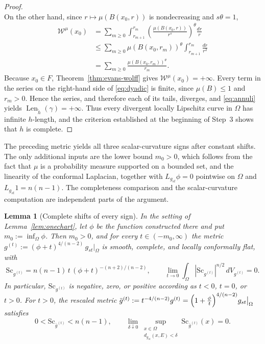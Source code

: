 \documentclass[12pt,oneside,a4paper]{article}
\theoremstyle{mytheorem}
\newtheorem{lemma}[definition]{Lemma}
\theoremstyle{remark}
\theoremstyle{definition}
\begin{document}
\begin{proof}
\begin{equation}
\end{equation}
On the other hand, since $r\mapsto\mu(B(x_0,r))$ is nondecreasing and
$s\theta=1$,
\begin{equation}\label{eq:dyadic}
\begin{aligned}
 \mathcal{W}^{\mu}(x_0)
 &=
 \sum_{m\ge0}
 \int_{r_{m+1}}^{r_m}
 \left(
 \frac{\mu(B(x_0,r))}{r^s}
 \right)^\theta
 \frac{dr}{r}
 \\
 &\le
 \sum_{m\ge0}
 \mu(B(x_0,r_m))^\theta
 \int_{r_{m+1}}^{r_m}\frac{dr}{r^2}
 \\
 &=
 \sum_{m\ge0}
 \frac{\mu(B(x_0,r_m))^\theta}{r_m}.
\end{aligned}
\end{equation}
Because $x_0\in F$, Theorem~\ref{thm:evans-wolff} gives
$\mathcal{W}^{\mu}(x_0)=+\infty$.  Every term in the series on the
right-hand side of \eqref{eq:dyadic} is finite, since $\mu(B)\leq1$ and
$r_m>0$.  Hence the series, and therefore each of its tails, diverges,
and \eqref{eq:annuli} yields
$\operatorname{Len}_{\widetilde h}(\gamma)=+\infty$.  Thus every
divergent locally Lipschitz curve in $\Omega$ has infinite $h$-length,
and the
criterion established at the beginning of Step~3 shows that $h$ is
complete.
\end{proof}



The preceding metric yields all three scalar-curvature signs after constant
shifts.  The only additional inputs are the lower bound $m_0>0$, which follows
from the fact that $\mu$ is a probability measure supported on a bounded set,
and the linearity of the conformal Laplacian, together with
$L_{g_{st}}\phi=0$ pointwise on \(\Omega\) and
$L_{g_{st}}1=n(n-1)$.  The completeness comparison
and the scalar-curvature computation are independent parts of the argument.

\begin{lemma}[Complete shifts of every sign]\label{lem:shifts}
In the setting of Lemma~\ref{lem:onechart}, let $\phi$ be the
function constructed there and put $m_0:=\inf_\Omega\phi$.  Then
$m_0>0$, and for every $t\in(-m_0,\infty)$ the metric
$g^{(t)}:=(\phi+t)^{4/(n-2)}\,g_{st}\big|_\Omega$ is smooth, complete,
and locally conformally flat, with
\begin{equation}\label{eq:curvature-identity}
 \mathrm{Sc}_{g^{(t)}}
 =n(n-1)\,t\,(\phi+t)^{-(n+2)/(n-2)},
 \qquad
 \lim_{t\to0}\int_\Omega|\mathrm{Sc}_{g^{(t)}}|^{n/2}\,dV_{g^{(t)}}=0.
\end{equation}
In particular, $\mathrm{Sc}_{g^{(t)}}$ is negative, zero, or positive
according as $t<0$, $t=0$, or $t>0$.  For $t>0$, the rescaled metric
$\bar g^{(t)}:=t^{-4/(n-2)}g^{(t)}
=\Bigl(1+\frac{\phi}{t}\Bigr)^{4/(n-2)}g_{st}\big|_\Omega$ satisfies
\[
 0<\mathrm{Sc}_{\bar g^{(t)}}<n(n-1),
 \qquad
 \lim_{\delta\downarrow0}
 \sup_{\substack{x\in\Omega\\d_{g_{st}}(x,E)<\delta}}
 \mathrm{Sc}_{\bar g^{(t)}}(x)=0.
\]
\end{lemma}
\end{document}
